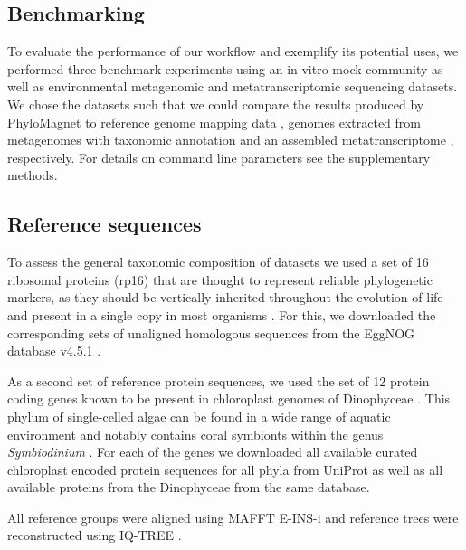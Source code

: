 \documentclass{bioinfo}
\begin{document}
\begin{methods}
\section{Benchmarking}
To evaluate the performance of our workflow and exemplify its potential uses, we performed three benchmark experiments using an in vitro mock community as well as environmental metagenomic and metatranscriptomic sequencing datasets. We chose the datasets such that we could compare the results produced by PhyloMagnet to reference genome mapping data \citep{Singer2016}, genomes extracted from metagenomes with taxonomic annotation \citep{Delmont2018} and an assembled metatranscriptome \citep{Frazier2017}, respectively. For details on command line parameters see the supplementary methods.

\subsection{Reference sequences}
To assess the general taxonomic composition of datasets we used a set of 16 ribosomal proteins (rp16) that are thought to represent reliable phylogenetic markers, as they should be vertically inherited throughout the evolution of life and present in a single copy in most organisms \citep{Brown2015}. For this, we downloaded the corresponding sets of unaligned homologous sequences from the EggNOG database v4.5.1 \citep[][see Table \ref{X}]{Huerta-cepas2016b}.

As a second set of reference protein sequences, we used the set of 12 protein coding genes known to be present in chloroplast genomes of Dinophyceae \citep{Howe2008}. This phylum of single-celled algae can be found in a wide range of aquatic environment and notably contains coral symbionts within the genus \textit{Symbiodinium} \citep{Gomez2012}. For each of the genes we downloaded all available curated chloroplast encoded protein sequences for all phyla from UniProt \citep{Apweiler2004} as well as all available proteins from the Dinophyceae from the same database.

All reference groups were aligned using MAFFT E-INS-i \citep{Katoh2013} and reference trees were reconstructed using IQ-TREE \citep[under the LG+G+F model;][]{Nguyen2015}.


\end{methods}
\end{document}
